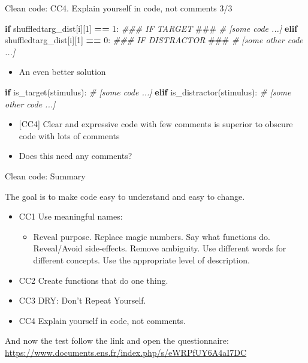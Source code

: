 \documentclass[
  8pt,
  ignorenonframetext,
]{beamer}
\newenvironment{Shaded}{\begin{snugshade}}{\end{snugshade}}
\newcommand{\AlertTok}[1]{\textcolor[rgb]{0.94,0.16,0.16}{#1}}
\newcommand{\CommentTok}[1]{\textcolor[rgb]{0.56,0.35,0.01}{\textit{#1}}}
\newcommand{\ControlFlowTok}[1]{\textcolor[rgb]{0.13,0.29,0.53}{\textbf{#1}}}
\newcommand{\DecValTok}[1]{\textcolor[rgb]{0.00,0.00,0.81}{#1}}
\newcommand{\NormalTok}[1]{#1}
\newcommand{\OperatorTok}[1]{\textcolor[rgb]{0.81,0.36,0.00}{\textbf{#1}}}
\providecommand{\tightlist}{%
  \setlength{\itemsep}{0pt}\setlength{\parskip}{0pt}}
\begin{document}
\begin{frame}[fragile]{Clean code: CC4. Explain yourself in code, not
comments 3/3}
\protect\hypertarget{clean-code-cc4.-explain-yourself-in-code-not-comments-33}{}
\begin{Shaded}
\begin{Highlighting}[]
\ControlFlowTok{if}\NormalTok{ shuffledtarg\_dist[i][}\DecValTok{1}\NormalTok{] }\OperatorTok{==} \DecValTok{1}\NormalTok{: }\CommentTok{\#\#\# IF TARGET }\AlertTok{\#\#\#}
    \CommentTok{\# [some code ...]}
\ControlFlowTok{elif}\NormalTok{ shuffledtarg\_dist[i][}\DecValTok{1}\NormalTok{] }\OperatorTok{==} \DecValTok{0}\NormalTok{: }\CommentTok{\#\#\# IF DISTRACTOR }\AlertTok{\#\#\#}
    \CommentTok{\# [some other code ...]}
\end{Highlighting}
\end{Shaded}

\begin{itemize}
\tightlist
\item
  An even better solution
\end{itemize}

\begin{Shaded}
\begin{Highlighting}[]
\ControlFlowTok{if}\NormalTok{ is\_target(stimulus):}
    \CommentTok{\# [some code ...]}
\ControlFlowTok{elif}\NormalTok{ is\_distractor(stimulus):}
    \CommentTok{\# [some other code ...]}
\end{Highlighting}
\end{Shaded}

\begin{itemize}
\item
  {[}CC4{]} Clear and expressive code with few comments is superior to
  obscure code with lots of comments
\item
  Does this need any comments?
\end{itemize}
\end{frame}

\begin{frame}{Clean code: Summary}
\protect\hypertarget{clean-code-summary}{}
\begin{block}{The goal is to make code easy to understand and easy to
change.}
\protect\hypertarget{the-goal-is-to-make-code-easy-to-understand-and-easy-to-change.}{}
\begin{itemize}
\item
  CC1 Use meaningful names:

  \begin{itemize}
  \tightlist
  \item
    Reveal purpose. Replace magic numbers. Say what functions do.
    Reveal/Avoid side-effects. Remove ambiguity. Use different words for
    different concepts. Use the appropriate level of description.
  \end{itemize}
\item
  CC2 Create functions that do one thing.
\item
  CC3 DRY: Don't Repeat Yourself.
\item
  CC4 Explain yourself in code, not comments.
\end{itemize}
\end{block}
\end{frame}

\begin{frame}{And now the test}
\protect\hypertarget{and-now-the-test}{}
follow the link and open the questionnaire:
\url{https://www.documents.ens.fr/index.php/s/eWRPfUY6A4aI7DC}
\end{frame}
\end{document}
